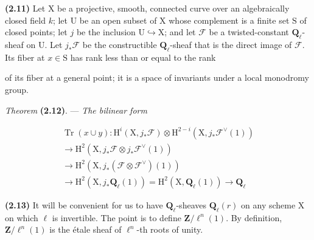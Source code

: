\documentclass[10pt,leqno]{article}
\begin{document}
\noindent \textbf{(2.11)} Let \(\mathrm{X}\) be a projective, smooth, connected curve over an algebraically closed field \(k\); let \(\mathrm{U}\) be an open subset of \(\mathrm{X}\) whose complement is a finite set \(\mathrm{S}\) of closed points; let \(j\) be the inclusion \(\mathrm{U}\hookrightarrow \mathrm{X}\); and let \(\mathcal{F} \) be a twisted-constant \(\mathbf{Q}_{\ell }\)-sheaf on \(\mathrm{U}\). Let \(j_{*}\mathcal{F} \) be the constructible \(\mathbf{Q}_{\ell }\)-sheaf that is the direct image of \(\mathcal{F} \). Its fiber at \(x\in \mathrm{S}\) has rank less than or equal to the rank\par

\clearpage

\label{physical-12}\par\smallskip

\noindent of its fiber at a general point; it is a space of invariants under a local monodromy group.\par

\noindent \emph{Theorem} \textbf{(2.12)}. — {\itshape The bilinear form}\par

\begin{equation*}\begin{gathered}\operatorname{Tr}(x\cup y) : \mathrm{H}^{i}(\mathrm{X},j_{*}\mathcal{F} )\otimes \mathrm{H}^{2- i}(\mathrm{X},j_{*}\mathcal{F} ^{\vee }(1)) \\ \longrightarrow  \mathrm{H}^{2}(\mathrm{X},j_{*}\mathcal{F} \otimes j_{*}\mathcal{F} ^{\vee }(1)) \\ \longrightarrow  \mathrm{H}^{2}(\mathrm{X},j_{*}(\mathcal{F} \otimes \mathcal{F} ^{\vee })(1)) \\ \longrightarrow  \mathrm{H}^{2}(\mathrm{X},j_{*}\mathbf{Q}_{\ell }(1)) = \mathrm{H}^{2}(\mathrm{X},\mathbf{Q}_{\ell }(1)) \longrightarrow  \mathbf{Q}_{\ell }\end{gathered}\end{equation*}

\par

\noindent \textbf{(2.13)} It will be convenient for us to have \(\mathbf{Q}_{\ell }\)-sheaves \(\mathbf{Q}_{\ell }(r)\) on any scheme \(\mathrm{X}\) on which \(\ell \) is invertible. The point is to define \(\mathbf{Z}/\ell ^{n}(1)\). By definition, \(\mathbf{Z}/\ell ^{n}(1)\) is the étale sheaf of \(\ell ^{n}\)-th roots of unity.\par
\end{document}
